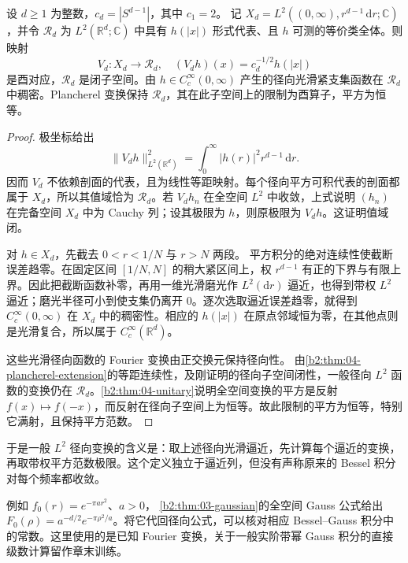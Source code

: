 \begin{lemma}[径向平方可积空间与光滑逼近]
\label{b2:lem:A2-radial-l2}
设 \(d\ge1\) 为整数，\(c_d=|S^{d-1}|\)，其中 \(c_1=2\)。
记 \(X_d=L^2((0,\infty),r^{d-1}\,\mathrm dr;\mathbb C)\)，并令
\(\mathcal R_d\) 为 \(L^2(\mathbb R^d;\mathbb C)\) 中具有
\(h(|x|)\) 形式代表、且 \(h\) 可测的等价类全体。则映射
\[
 V_d:X_d\longrightarrow\mathcal R_d,\quad
 (V_dh)(x)=c_d^{-1/2}h(|x|)
\]
是酉对应，\(\mathcal R_d\) 是闭子空间。由
\(h\in C_c^\infty(0,\infty)\) 产生的径向光滑紧支集函数在
\(\mathcal R_d\) 中稠密。Plancherel 变换保持 \(\mathcal R_d\)，其在此子空间上的限制为酉算子，平方为恒等。
\end{lemma}
\begin{proof}
极坐标给出
\[
 \|V_dh\|_{L^2(\mathbb R^d)}^2
 =\int_0^\infty|h(r)|^2r^{d-1}\,\mathrm dr.
\]
因而 \(V_d\) 不依赖剖面的代表，且为线性等距映射。每个径向平方可积代表的剖面都属于 \(X_d\)，所以其值域恰为
\(\mathcal R_d\)。若 \(V_dh_n\) 在全空间 \(L^2\) 中收敛，上式说明
\((h_n)\) 在完备空间 \(X_d\) 中为 Cauchy 列；设其极限为 \(h\)，则原极限为 \(V_dh\)。这证明值域闭。

对 \(h\in X_d\)，先截去 \(0<r<1/N\) 与 \(r>N\) 两段。
平方积分的绝对连续性使截断误差趋零。在固定区间
\([1/N,N]\) 的稍大紧区间上，权 \(r^{d-1}\) 有正的下界与有限上界。因此把截断函数补零，再用一维光滑磨光作
\(L^2(\mathrm dr)\) 逼近，也得到带权 \(L^2\) 逼近；磨光半径可小到使支集仍离开 \(0\)。逐次选取逼近误差趋零，就得到
\(C_c^\infty(0,\infty)\) 在 \(X_d\) 中的稠密性。相应的
\(h(|x|)\) 在原点邻域恒为零，在其他点则是光滑复合，所以属于
\(C_c^\infty(\mathbb R^d)\)。

这些光滑径向函数的 Fourier 变换由正交换元保持径向性。
由\cref{b2:thm:04-plancherel-extension}的等距连续性，及刚证明的径向子空间闭性，一般径向 \(L^2\) 函数的变换仍在
\(\mathcal R_d\)。\cref{b2:thm:04-unitary}说明全空间变换的平方是反射 \(f(x)\mapsto f(-x)\)，而反射在径向子空间上为恒等。故此限制的平方为恒等，特别它满射，且保持平方范数。
\end{proof}

于是一般 \(L^2\) 径向变换的含义是：取上述径向光滑逼近，先计算每个逼近的变换，再取带权平方范数极限。这个定义独立于逼近列，但没有声称原来的 Bessel 积分对每个频率都收敛。

\ProseParagraphBreak

例如 \(f_0(r)=e^{-\pi a r^2}\)、\(a>0\)，
\cref{b2:thm:03-gaussian}的全空间 Gauss 公式给出
\(F_0(\rho)=a^{-d/2}e^{-\pi\rho^2/a}\)。将它代回径向公式，可以核对相应 Bessel--Gauss 积分中的常数。这里使用的是已知 Fourier 变换，关于一般实阶带幂 Gauss 积分的直接级数计算留作章末训练。

